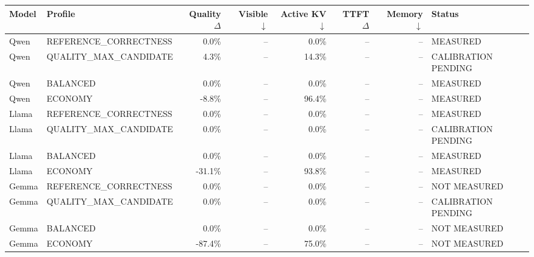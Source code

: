 \begin{tabular}{llrrrrrl}
\toprule
Model & Profile & Quality $\Delta$ & Visible $\downarrow$ & Active KV $\downarrow$ & TTFT $\Delta$ & Memory $\downarrow$ & Status \\
\midrule
Qwen & REFERENCE\_CORRECTNESS & 0.0\% & -- & 0.0\% & -- & -- & MEASURED \\
Qwen & QUALITY\_MAX\_CANDIDATE & 4.3\% & -- & 14.3\% & -- & -- & CALIBRATION PENDING \\
Qwen & BALANCED & 0.0\% & -- & 0.0\% & -- & -- & MEASURED \\
Qwen & ECONOMY & -8.8\% & -- & 96.4\% & -- & -- & MEASURED \\
Llama & REFERENCE\_CORRECTNESS & 0.0\% & -- & 0.0\% & -- & -- & MEASURED \\
Llama & QUALITY\_MAX\_CANDIDATE & 0.0\% & -- & 0.0\% & -- & -- & CALIBRATION PENDING \\
Llama & BALANCED & 0.0\% & -- & 0.0\% & -- & -- & MEASURED \\
Llama & ECONOMY & -31.1\% & -- & 93.8\% & -- & -- & MEASURED \\
Gemma & REFERENCE\_CORRECTNESS & 0.0\% & -- & 0.0\% & -- & -- & NOT MEASURED \\
Gemma & QUALITY\_MAX\_CANDIDATE & 0.0\% & -- & 0.0\% & -- & -- & CALIBRATION PENDING \\
Gemma & BALANCED & 0.0\% & -- & 0.0\% & -- & -- & NOT MEASURED \\
Gemma & ECONOMY & -87.4\% & -- & 75.0\% & -- & -- & NOT MEASURED \\
\bottomrule
\end{tabular}

